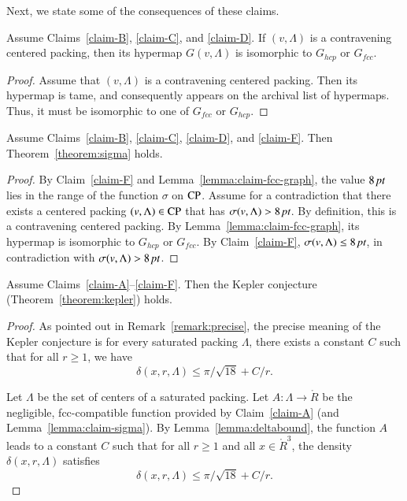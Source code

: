 Next, we state some of the consequences of these claims.

\begin{lemma}\label{lemma:claim-fcc-graph}
Assume Claims~\ref{claim-B}, \ref{claim-C}, and \ref{claim-D}. If
$(v,\Lambda)$ is a contravening centered packing, then its hypermap $G(v,\Lambda)$
is isomorphic to $G_{hcp}$ or $G_{fcc}$.
\end{lemma}

\begin{proof} Assume that $(v,\Lambda)$ is a contravening centered packing.  Then its hypermap is tame, and consequently appears on the
archival list of hypermaps.  Thus, it must be isomorphic to one of
$G_{fcc}$ or $G_{hcp}$.
\end{proof}

\begin{lemma}\label{lemma:claim-sigma}
Assume Claims~\ref{claim-B}, \ref{claim-C}, \ref{claim-D}, and
\ref{claim-F}. Then Theorem~\ref{theorem:sigma} holds.
\end{lemma}

\begin{proof}
By Claim~\ref{claim-F} and Lemma~\ref{lemma:claim-fcc-graph}, the
value $8\,\hbox{\it pt}$ lies in the range of the function $\sigma$ on
${\operatorname{CP}}$.   Assume for a contradiction that there exists a
centered packing $(v,\Lambda)\in {\operatorname{CP}}$ that has $\sigma(v,\Lambda)>8\,\hbox{\it pt}$. By
definition, this is a contravening centered packing. By
Lemma~\ref{lemma:claim-fcc-graph}, its hypermap is isomorphic to
$G_{hcp}$ or $G_{fcc}$.  By Claim~\ref{claim-F}, $\sigma(v,\Lambda)\le
8\,\hbox{\it pt}$, in contradiction with $\sigma(v,\Lambda)>8\,\hbox{\it pt}$.
\end{proof}


\begin{lemma}
Assume Claims~\ref{claim-A}--\ref{claim-F}. Then the Kepler
conjecture (Theorem~\ref{theorem:kepler}) holds.
\end{lemma}

\begin{proof} As pointed out in Remark~\ref{remark:precise}, the precise
meaning of the Kepler conjecture is for every saturated packing
$\Lambda$, there exists a constant $C$ such that for all $r\ge 1$,
we have
    $$\delta(x,r,\Lambda)\le\pi/\sqrt{18} + C/r.$$

Let $\Lambda$ be the set of centers of a saturated packing.  Let
$A:\Lambda \to \ring{R}$ be the negligible, fcc-compatible
function provided by Claim~\ref{claim-A} (and
Lemma~\ref{lemma:claim-sigma}). By Lemma~\ref{lemma:deltabound},
the function $A$ leads to a constant $C$ such that for all $r\ge
1$ and all $x\in \ring{R}^3$, the density $\delta(x,r,\Lambda)$
satisfies
   $$\delta(x,r,\Lambda) \le \pi/\sqrt{18} + C/r.$$
\end{proof}

